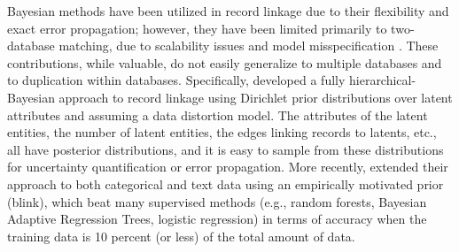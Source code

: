 \documentclass[11pt]{article}
\begin{document}

Bayesian methods have been utilized in record linkage due to their flexibility and exact error propagation; however, they have been limited primarily to two-database matching, due to scalability issues and model misspecification \citep{copas_1990, gutman_2013, liseo_2011, Sadinle14, sadinle2016bayesian}.  These contributions, while valuable, do not easily generalize to multiple databases and to duplication within databases.  Specifically, \cite{steorts14smered, steorts??bayesian} developed a fully hierarchical-Bayesian approach to record linkage using Dirichlet prior distributions over latent attributes and assuming a data distortion model. 
The attributes of the latent entities, the number of latent entities, the edges linking records to latents, etc., all have posterior distributions, and it is easy to sample from these distributions for uncertainty quantification or error propagation.  
More recently, \citep{steorts15entity} extended their approach to both categorical and text data using an empirically motivated prior (blink), which beat many supervised methods (e.g., random forests, Bayesian Adaptive Regression Trees, logistic regression) in terms of accuracy when the training data is 10 percent (or less) of the total amount of data. 

\end{document}
